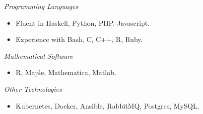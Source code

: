 \documentclass[11pt,article,oneside]{memoir}
\begin{document}
\bigskip









\ind \emph{Programming Languages}
\small
\begin{itemize}
  \item Fluent in Haskell, Python, PHP, Javascript.
  \item Experience with Bash, C, C++, R, Ruby.
\end{itemize}
\normalsize

\ind \emph{Mathematical Software}
\small
\begin{itemize}
  \item R, Maple, Mathematica, Matlab.
\end{itemize}
\normalsize

\ind \emph{Other Technologies}
\small
\begin{itemize}
  \item Kubernetes, Docker, Ansible, RabbitMQ, Postgres, MySQL.
\end{itemize}
\normalsize

\bigskip

\end{document}
